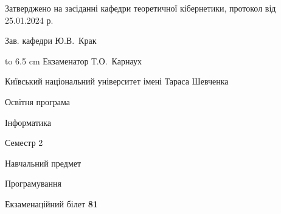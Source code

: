 \documentclass[12pt, ukrainian]{article}
\begin{document}
{\smallskip\smallskip \begin {scriptsize} Затверджено на засіданні кафедри теоретичної кібернетики, протокол   від   25.01.2024 р.\par\smallskip\smallskip\smallskip\smallskip
{\parbox {6.5 cm} {Зав. кафедри \dotfill Ю.В.~Крак}}\hspace {0.7cm} {\hbox to 6.5 cm { Екзаменатор \dotfill Т.О.~Карнаух}} \end{scriptsize}}
\newpage
{{\begin {scriptsize}\par
{ \center  Київський національний університет імені Тараса Шевченка \par}
{\parbox {5 cm}{Освітня програма \hfill}{\parbox {7 cm}{Інформатика\hfill}}\parbox {6 cm}{\hfill Семестр 2}}\par
{\parbox {5 cm} {Навчальний предмет \hfill}\parbox {7 cm}{Програмування \hfill}\parbox {6cm}{\hfill}\par}\vspace{-15pt} \end{scriptsize}}{\center Екзаменаційний білет \No \textbf { 81 }\par}}
\end{document}
